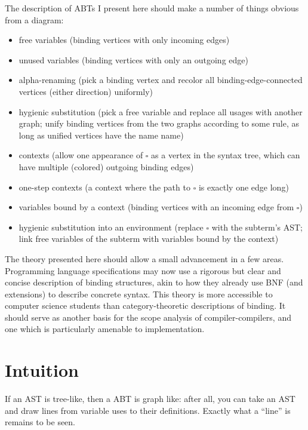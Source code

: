 \documentclass[11pt]{article} %
\theoremstyle{definition}
\begin{document}
The description of ABTs I present here should make a number of things obvious from a diagram:
\begin{itemize}
    \item free variables (binding vertices with only incoming edges)
    \item unused variables (binding vertices with only an outgoing edge)
    \item alpha-renaming (pick a binding vertex and recolor all binding-edge-connected vertices (either direction) uniformly)
    \item hygienic substitution (pick a free variable and replace all usages with another graph; unify binding vertices from the two graphs according to some rule, as long as unified vertices have the name name)
    \item contexts (allow one appearance of $\square$ as a vertex in the syntax tree, which can have multiple (colored) outgoing binding edges)
    \item one-step contexts (a context where the path to $\square$ is exactly one edge long)
    \item variables bound by a context (binding vertices with an incoming edge from $\square$)
    \item hygienic substitution into an environment (replace $\square$ with the subterm's AST; link free variables of the subterm with variables bound by the context)
\end{itemize}

The theory presented here should allow a small advancement in a few areas.
Programming language specifications may now use a rigorous but clear and concise description of binding structures, akin to how they already use BNF (and extensions) to describe concrete syntax.
This theory is more accessible to computer science students than category-theoretic descriptions of binding.
It should serve as another basis for the scope analysis of compiler-compilers, and one which is particularly amenable to implementation.


\part{Intuition}

If an AST is tree-like, then a ABT is graph like: after all, you can take an AST and draw lines from variable uses to their definitions.
Exactly what a ``line'' is remains to be seen.
\end{document}
